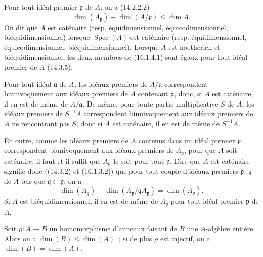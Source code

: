 \begin{env}[16.1.4]
\label{0.16.1.4-fr}
Pour tout idéal premier $\mathfrak{p}$ de $A$, on a (14.2.2.2)
\[
\label{0.16.1.4.1-fr}
  \dim(A_{\mathfrak{p}})+\dim(A/\mathfrak{p})\leq\dim A.
\tag{16.1.4.1}
\]
On dit que $A$ est caténaire (resp. équidimensionnel, équicodimensionnel,
biéquidimensionnel) lorsque $\operatorname{Spec}(A)$ est caténaire (resp.
équidimensionnel,
équicodimensionnel, biéquidimensionnel). Lorsque $A$ est noethérien et
biéquidimensionnel, les deux membres de (16.1.4.1) sont égaux pour tout idéal
premier de $A$ (14.3.5).

Pour tout idéal $\mathfrak{a}$ de $A$, les idéaux premiers de
$A/\mathfrak{a}$ correspondent biunivoquement aux idéaux premiers de $A$
contenant $\mathfrak{a}$, donc, si $A$ est caténaire, il en est de même de
$A/\mathfrak{a}$. De même, pour toute partie multiplicative $S$ de $A$, les
idéaux premiers de $S^{-1}A$ correspondent biunivoquement aux idéaux premiers
de $A$ ne rencontrant pas $S$, donc si $A$ est caténaire, il en est de même de
$S^{-1}A$.

En outre, comme les idéaux premiers de $A$ contenus dans un idéal premier
$\mathfrak{p}$ correspondent biunivoquement aux idéaux premiers de
$A_{\mathfrak{p}}$, pour que $A$ soit caténaire, il faut et il suffit que
$A_{\mathfrak{p}}$ le soit pour tout $\mathfrak{p}$. Dire que $A$ est
caténaire signifie donc ((14.3.2) et (16.1.3.2)) que pour tout couple d'idéaux
premiers $\mathfrak{p}$, $\mathfrak{q}$ de $A$ tels que
$\mathfrak{q}\subset\mathfrak{p}$, on a
\[
\label{0.16.1.4.2-fr}
  \dim(A_{\mathfrak{q}})
  +\dim(A_{\mathfrak{p}}/\mathfrak{q}A_{\mathfrak{p}})
  =\dim(A_{\mathfrak{p}}).
\tag{16.1.4.2}
\]
Si $A$ est biéquidimensionnel, il en est de même de $A_{\mathfrak{p}}$ pour
tout idéal premier $\mathfrak{p}$ de $A$.
\end{env}

\begin{proposition}[16.1.5]
\label{0.16.1.5-fr}
Soit $\rho:A\to B$ un homomorphisme d'anneaux faisant de $B$ une $A$-algèbre
entière. Alors on a $\dim(B)\leq\dim(A)$~; si de plus $\rho$ est injectif, on a
$\dim(B)=\dim(A)$.
\end{proposition}

